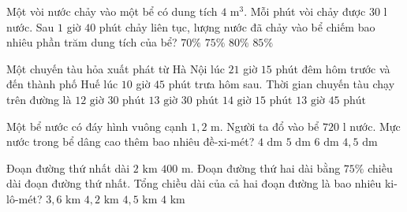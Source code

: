 \begin{ex} %
Một vòi nước chảy vào một bể có dung tích $4\text{ m}^3$. Mỗi phút vòi chảy được $30\text{ l}$ nước. Sau $1$ giờ $40$ phút chảy liên tục, lượng nước đã chảy vào bể chiếm bao nhiêu phần trăm dung tích của bể?
\choice
{$70\%$}
{\True $75\%$}
{$80\%$}
{$85\%$}
\end{ex}

\begin{ex} %
Một chuyến tàu hỏa xuất phát từ Hà Nội lúc $21$ giờ $15$ phút đêm hôm trước và đến thành phố Huế lúc $10$ giờ $45$ phút trưa hôm sau. Thời gian chuyến tàu chạy trên đường là
\choice
{$12\text{ giờ } 30\text{ phút}$}
{\True $13\text{ giờ } 30\text{ phút}$}
{$14\text{ giờ } 15\text{ phút}$}
{$13\text{ giờ } 45\text{ phút}$}
\end{ex}

\begin{ex} %
Một bể nước có đáy hình vuông cạnh $1{,}2\text{ m}$. Người ta đổ vào bể $720\text{ l}$ nước. Mực nước trong bể dâng cao thêm bao nhiêu đề-xi-mét?
\choice
{$4\text{ dm}$}
{\True $5\text{ dm}$}
{$6\text{ dm}$}
{$4{,}5\text{ dm}$}
\end{ex}

\begin{ex} %
Đoạn đường thứ nhất dài $2\text{ km } 400\text{ m}$. Đoạn đường thứ hai dài bằng $75\%$ chiều dài đoạn đường thứ nhất. Tổng chiều dài của cả hai đoạn đường là bao nhiêu ki-lô-mét?
\choice
{$3{,}6\text{ km}$}
{\True $4{,}2\text{ km}$}
{$4{,}5\text{ km}$}
{$4\text{ km}$}
\end{ex}

